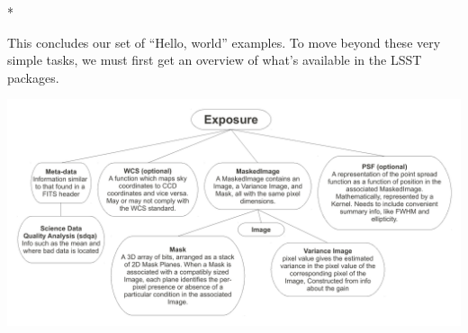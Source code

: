 \centerline{*}

This concludes our set of ``Hello, world'' examples.  To move beyond
these very simple tasks, we must first get an overview of what's
available in the LSST packages.

\includegraphics[angle=90,scale=0.5]{./figures/exposure.pdf}





